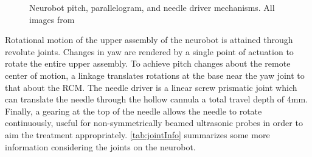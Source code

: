 \documentclass[12pt]{report}
\begin{document}
\begin{figure}[thpb]
	\centering
	\hfill
  \label{subKin3}
    \caption{Neurobot pitch, parallelogram, and needle driver mechanisms. All images from \cite{neurobotIros}}
    \label{fig:neurobotKinematics}
\end{figure}

Rotational motion of the upper assembly of the neurobot is attained through revolute joints. Changes in yaw are rendered by a single point of actuation to rotate the entire upper assembly. To achieve pitch changes about the remote center of motion, a linkage translates rotations at the base near the yaw joint to that about the RCM. The needle driver is a linear screw prismatic joint which can translate the needle through the hollow cannula a total travel depth of 4mm. Finally, a gearing at the top of the needle allows the needle to rotate continuously, useful for non-symmetrically beamed ultrasonic probes in order to aim the treatment appropriately. \autoref{tab:jointInfo} summarizes some more information considering the joints on the neurobot.
\end{document}
